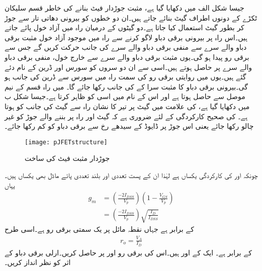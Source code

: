 جیسا شکل  الف میں دکھایا گیا ہے، مثبت جوڑدار فیٹ بنانے کی خاطر  قسم سلیکان ٹکڑے کے دونوں اطراف  گیٹ بنائے جاتے ہیں۔ان دو خطوں کو بیرونی دھاتی تار سے جوڑ کر بطور  گیٹ  استعمال کیا جاتا ہے۔دو گیٹوں کے درمیان راہ میں آزاد خول پائے جاتے ہیں۔اس راہ پر بیرونی برقی دباو  لاگو کرنے سے راہ میں موجود آزاد خول مثبت برقی دباو والے سرے سے منفی برقی دباو والے سرے کی جانب حرکت کریں گے جس سے برقی رو  پیدا ہو گی۔یوں مثبت برقی دباو والے سرے سے خارج خول، منفی برقی دباو والے سرے پر حاصل ہوتے ہیں۔اسی سے ان دو سروں کو سورس  اور ڈرین  کے نام دئے گئے ہیں۔یوں  میں روایتی برقی رو کی سمت راہ میں سورس سے ڈرین کی جانب ہو گی۔بیرونی برقی دباو کا مثبت سرا  کے  کی جانب رکھا جائے گا۔ میں راہ  قسم کے نیم موصل سے حاصل ہوتا ہے اور اس کے نام میں  اسی  کو ظاہر کرتا ہے۔جیسا شکل  ب میں دکھایا گیا ہے،  کی علامت میں گیٹ پر تیر کا نشان راہ سے گیٹ کی جانب کو ہوتا ہے۔ کی صحیح کارکردگی کے لئے ضروری ہے کہ گیٹ اور راہ پر بننے والے  جوڑ کو غیر چالو رکھا جائے یعنی اس جوڑ پر ڈایوڈ کے سیدھے رخ  سے برقی دباو کو کم رکھا جائے۔
\begin{figure}
\centering
\texttt{[image: pJFETstructure]}
\caption{جوڑدار مثبت فیٹ کی ساخت}
\label{شکل_جوڑدار_مثبت_فیٹ_ساخت}
\end{figure}
چونکہ  اور  کی کارکردگی یکساں ہے لہٰذا ان کے پست تعددی اور بلند تعددی پائے ماڈل بھی یکساں ہیں۔یہاں
\begin{align} \label{مساوات_افزائش_فیٹ}
g_m &=\left(\frac{-2  I_{DSS}}{V_p} \right) \left(1-\frac{V_{GS}}{V_p} \right) \\
&=\left(\frac{-2  I_{DSS}}{V_p} \right)  \sqrt{\frac{I_D}{I_{DSS}}}
\end{align} 
کے برابر ہے جہاں  نقطہ مائل پر یک سمتی برقی رو ہے۔اسی طرح
\begin{align}
r_o=\frac{V_A}{I_D}
\end{align} 
کے برابر ہے۔
ایک  کے  اور  ہیں۔اس کی برقی رو  اور  پر حاصل کریں۔ارلی برقی دباو کے اثر کو نظر انداز کریں۔

